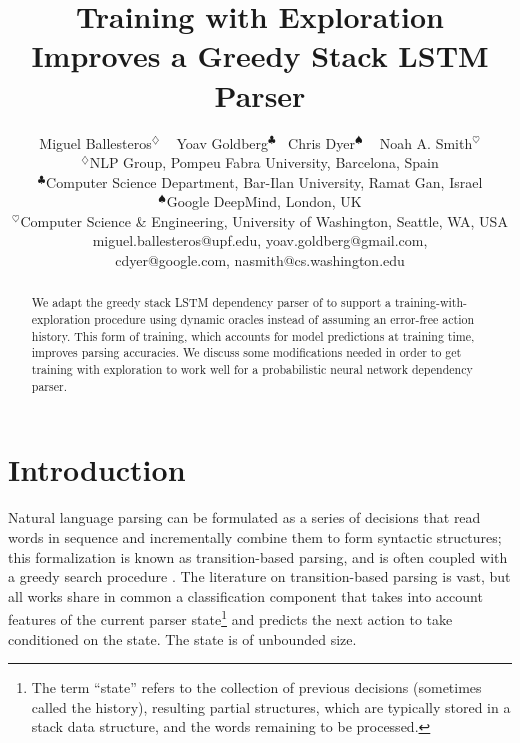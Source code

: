 \documentclass[11pt]{article}
\begin{document}

%

\title{Training with Exploration Improves a Greedy Stack LSTM Parser}
\author{Miguel Ballesteros$^{\diamondsuit}$ ~ Yoav Goldberg$^{\clubsuit}$~ Chris Dyer$^{\spadesuit}$ ~ Noah A. Smith$^{\heartsuit}$\\
$^\diamondsuit$NLP Group, Pompeu Fabra University, Barcelona, Spain \\
$^\clubsuit$Computer Science Department, Bar-Ilan University, Ramat Gan, Israel \\
$^\spadesuit$Google DeepMind, London, UK \\
$^{\heartsuit}$Computer Science \& Engineering, University of Washington, Seattle, WA, USA\\
{ \sf miguel.ballesteros@upf.edu, yoav.goldberg@gmail.com, } \\
{\sf  cdyer@google.com, nasmith@cs.washington.edu}
}


\maketitle              %


\begin{abstract}
    We adapt the greedy stack LSTM dependency parser of  to support a
    training-with-exploration procedure using dynamic oracles
    \cite{goldberg2013training} instead of assuming an error-free
    action history. This form of training, which accounts for model predictions at training time, improves
    parsing accuracies.  We discuss some modifications needed in order
    to get training with exploration to work well for a probabilistic
    neural network
    dependency parser.
\end{abstract}

\section{Introduction}

Natural language parsing can be formulated as a series of decisions that read
words in sequence and incrementally combine them to form syntactic structures;
this formalization is known as transition-based parsing, and is often coupled
with a greedy search procedure
\cite{yamada03,nivre03iwpt,nivre2004,nivre08cl}. 
The literature on transition-based parsing is vast, but all works share in
common a classification component that takes into account features of the current
parser state\footnote{The term ``state''
 refers to the collection of previous decisions (sometimes called the history),
 resulting partial structures, which are typically stored in a stack data structure,
 and the words remaining to be processed.} and predicts the next action to
 take conditioned on the state. The state is of unbounded size.
\end{document}

